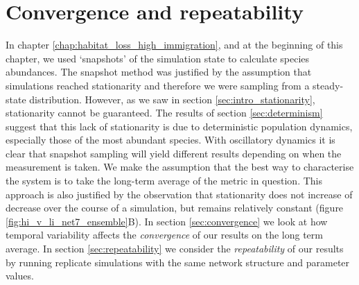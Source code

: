 

\section{Convergence and repeatability}
\label{sec:reliability}


In chapter \ref{chap:habitat_loss_high_immigration}, and at the beginning of this chapter, we used `snapshots' of the simulation state to calculate species abundances. The snapshot method was justified by the assumption that simulations reached stationarity and therefore we were sampling from a steady-state distribution. However, as we saw in section \ref{sec:intro_stationarity}, stationarity cannot be guaranteed. The results of section \ref{sec:determinism} suggest that this lack of stationarity is due to deterministic population dynamics, especially those of the most abundant species. With oscillatory dynamics it is clear that snapshot sampling will yield different results depending on when the measurement is taken. We make the assumption that the best way to characterise the system is to take the long-term average of the metric in question. This approach is also justified by the observation that stationarity does not increase of decrease over the course of a simulation, but remains relatively constant (figure \ref{fig:hi_v_li_net7_ensemble}B). In section \ref{sec:convergence} we look at how temporal variability affects the \emph{convergence} of our results on the long term average. In section \ref{sec:repeatability} we consider the \emph{repeatability} of our results by running replicate simulations with the same network structure and parameter values.

